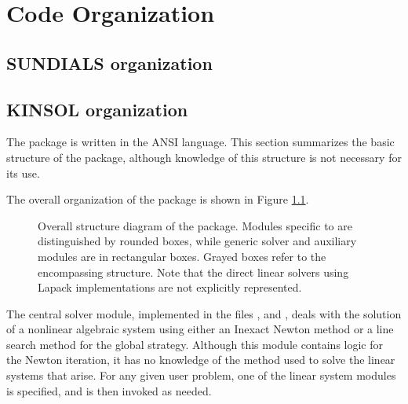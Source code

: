 \chapter{Code Organization}\label{s:organization}

\section{SUNDIALS organization}\label{ss:sun_org}


\section{KINSOL organization}\label{ss:kinsol_org}

The {\kinsol} package is written in the ANSI {\C} language. This section
summarizes the basic structure of the package, although knowledge
of this structure is not necessary for its use.

The overall organization of the {\kinsol} package is shown in Figure
\ref{f:kinorg}.
\begin{figure}
{\centerline{}}
\caption [Overall structure diagram of the KINSOL package]
{Overall structure diagram of the {\kinsol} package.
  Modules specific to {\kinsol} are distinguished by rounded boxes, while
  generic solver and auxiliary modules are in rectangular boxes.
  Grayed boxes refer to the encompassing {\sundials} structure.
  Note that the direct linear solvers using Lapack implementations are not 
  explicitly represented.}
\label{f:kinorg}
\end{figure}
The central solver module, implemented in the files
,  and , deals with the solution
of a nonlinear algebraic system using either an Inexact Newton method or a
line search method for the global strategy. Although this module contains logic
for the Newton iteration, it has no knowledge of the method used to solve the
linear systems that arise. For any given user problem, one of the linear system
modules is specified, and is then invoked as needed.

